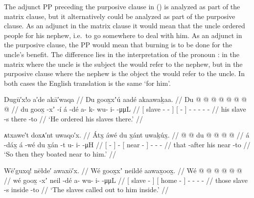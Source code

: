 The adjunct PP  preceding the purposive clause in (\lastx) is analyzed as part of the matrix clause, but it alternatively could be analyzed as part of the purposive clause.
As an adjunct in the matrix clause it would mean that the uncle ordered people for his nephew, i.e.\ to go somewhere to deal with him.
As an adjunct in the purposive clause, the PP would mean that burning is to be done for the uncle’s benefit.
The difference lies in the interpretation of the pronoun : in the matrix where the uncle is the subject the  would refer to the nephew, but in the purposive clause where the nephew is the object the  would refer to the uncle.
In both cases the English translation is the same ‘for him’.

\ex\label{ex:90-53-ordered-his-slaves}%
%
\begingl
	\glpreamble	Dugū′x!o a′de akā′waqa //
	\glpreamble	Du goox̱xʼú aadé akaawaḵaa. //
	\gla	{} Du  @ {} @ {} {}
		{}  @ {} {}
		 @ {} @ {} @ {} @ {} @ {} //
	\glb	{} du goox̱ -xʼ -í {}
		{} á -dé {}
		a- k- wu- i-  -μμL //
	\glc	{}[  slave - - {}]
		{}[  - {}]
		- - - -  - //
	\gld	{} his slave -s {} {}
		{} there -to {}
		 {} {} {} {} {} //
	\glft	‘He ordered his slaves there.’
		//
\endgl
\xe

\ex\label{ex:90-54-boated-near}%
%
\begingl
	\glpreamble	ᴀtxawe′t doxᴀ′nt uwaqo′x. //
	\glpreamble	Átx̱ áwé du x̱ánt uwaḵúx̱. //
	\gla	{}  @ {} {}
		 @ {}
		{} du  @ {} {}
		 @ {} @ {} @ {} //
	\glb	{} á -dáx̱ {}
		á -wé
		{} du x̱án -t {}
		u- i-  -μH //
	\glc	{}[  - {}]
		 -
		{}[  near - {}]
		- -  - //
	\gld	{} that -after {}
		 {}
		{} his near -to {}
		 {} {} {} //
	\glft	‘So then they boated near to him.’
		//
\endgl
\xe

\ex\label{ex:90-55-called-inside}%
%
\begingl
	\glpreamble	Wē′guxq! nēłde′ awaxō′x. //
	\glpreamble	Wé goox̱xʼ neildé aawax̱oox̱. //
	\gla	{} Wé  @ {} {}
		{}  @ {} {}
		 @ {} @ {} @ {} @ {} //
	\glb	{} wé goox̱ -xʼ {}
		{} neil -dé {}
		a- wu- i-  -μμL //
	\glc	{}[  slave - {}]
		{}[ home - {}]
		- - -  - //
	\gld	{} those slave -s {}
		{} inside -to {}
		 {} {} {} {} {} //
	\glft	‘The slaves called out to him inside.’
		//
\endgl
\xe

